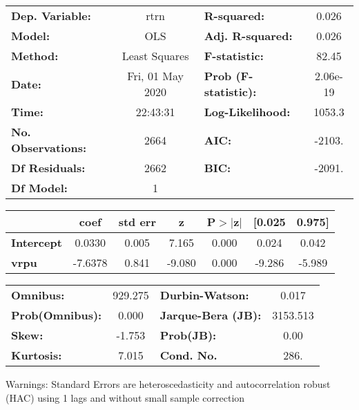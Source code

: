 \begin{center}
\begin{tabular}{lclc}
\toprule
\textbf{Dep. Variable:}    &       rtrn       & \textbf{  R-squared:         } &     0.026   \\
\textbf{Model:}            &       OLS        & \textbf{  Adj. R-squared:    } &     0.026   \\
\textbf{Method:}           &  Least Squares   & \textbf{  F-statistic:       } &     82.45   \\
\textbf{Date:}             & Fri, 01 May 2020 & \textbf{  Prob (F-statistic):} &  2.06e-19   \\
\textbf{Time:}             &     22:43:31     & \textbf{  Log-Likelihood:    } &    1053.3   \\
\textbf{No. Observations:} &        2664      & \textbf{  AIC:               } &    -2103.   \\
\textbf{Df Residuals:}     &        2662      & \textbf{  BIC:               } &    -2091.   \\
\textbf{Df Model:}         &           1      & \textbf{                     } &             \\
\bottomrule
\end{tabular}
\begin{tabular}{lcccccc}
                   & \textbf{coef} & \textbf{std err} & \textbf{z} & \textbf{P$> |$z$|$} & \textbf{[0.025} & \textbf{0.975]}  \\
\midrule
\textbf{Intercept} &       0.0330  &        0.005     &     7.165  &         0.000        &        0.024    &        0.042     \\
\textbf{vrpu}      &      -7.6378  &        0.841     &    -9.080  &         0.000        &       -9.286    &       -5.989     \\
\bottomrule
\end{tabular}
\begin{tabular}{lclc}
\textbf{Omnibus:}       & 929.275 & \textbf{  Durbin-Watson:     } &    0.017  \\
\textbf{Prob(Omnibus):} &   0.000 & \textbf{  Jarque-Bera (JB):  } & 3153.513  \\
\textbf{Skew:}          &  -1.753 & \textbf{  Prob(JB):          } &     0.00  \\
\textbf{Kurtosis:}      &   7.015 & \textbf{  Cond. No.          } &     286.  \\
\bottomrule
\end{tabular}
\end{center}

Warnings: \newline
 [1] Standard Errors are heteroscedasticity and autocorrelation robust (HAC) using 1 lags and without small sample correction